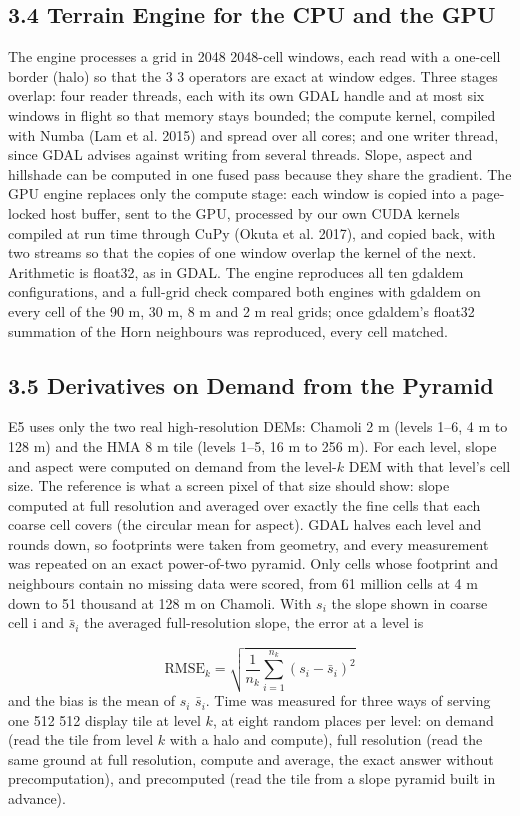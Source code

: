 \documentclass[10pt,a4paper]{article}
\begin{document}
\subsection*{3.4 Terrain Engine for the CPU and the GPU}
The engine processes a grid in 2048 \texttimes{} 2048-cell windows, each read with a one-cell border (halo) so that the 3 \texttimes{} 3 operators are exact at window edges. Three stages overlap: four reader threads, each with its own GDAL handle and at most six windows in flight so that memory stays bounded; the compute kernel, compiled with Numba (Lam et al. 2015) and spread over all cores; and one writer thread, since GDAL advises against writing from several threads. Slope, aspect and hillshade can be computed in one fused pass because they share the gradient. The GPU engine replaces only the compute stage: each window is copied into a page-locked host buffer, sent to the GPU, processed by our own CUDA kernels compiled at run time through CuPy (Okuta et al. 2017), and copied back, with two streams so that the copies of one window overlap the kernel of the next. Arithmetic is float32, as in GDAL. The engine reproduces all ten gdaldem configurations, and a full-grid check compared both engines with gdaldem on every cell of the 90 m, 30 m, 8 m and 2 m real grids; once gdaldem's float32 summation of the Horn neighbours was reproduced, every cell matched.

\subsection*{3.5 Derivatives on Demand from the Pyramid}
E5 uses only the two real high-resolution DEMs: Chamoli 2 m (levels 1--6, 4 m to 128 m) and the HMA 8 m tile (levels 1--5, 16 m to 256 m). For each level, slope and aspect were computed on demand from the level-$k$ DEM with that level's cell size. The reference is what a screen pixel of that size should show: slope computed at full resolution and averaged over exactly the fine cells that each coarse cell covers (the circular mean for aspect). GDAL halves each level and rounds down, so footprints were taken from geometry, and every measurement was repeated on an exact power-of-two pyramid. Only cells whose footprint and neighbours contain no missing data were scored, from 61 million cells at 4 m down to 51 thousand at 128 m on Chamoli. With $s_i$ the slope shown in coarse cell i and $\bar{s}_i$ the averaged full-resolution slope, the error at a level is

\begin{equation}\mathrm{RMSE}_{k}=\sqrt{\frac{1}{n_{k}}\sum_{i=1}^{n_{k}}\left(s_{i}-\bar{s}_{i}\right)^{2}}\end{equation}
and the bias is the mean of $s_i$ \textminus{} $\bar{s}_i$. Time was measured for three ways of serving one 512 \texttimes{} 512 display tile at level $k$, at eight random places per level: on demand (read the tile from level $k$ with a halo and compute), full resolution (read the same ground at full resolution, compute and average, the exact answer without precomputation), and precomputed (read the tile from a slope pyramid built in advance).
\end{document}

